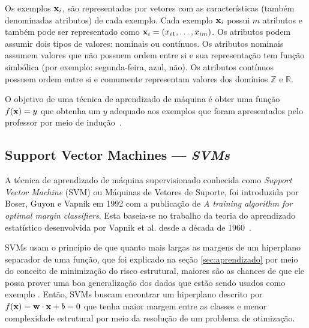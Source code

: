 Os exemplos $\mathbf{x}_i$, são representados por vetores com as características (também denominadas atributos) de cada exemplo. Cada exemplo $\mathbf{x}_i$ possui $m$ atributos e também pode ser representado como $\mathbf{x}_i = (x_{i1},\dotsc,x_{im})$. Os atributos podem assumir dois tipos de valores: nominais ou contínuos. Os atributos nominais assumem valores que não possuem ordem entre si e sua representação tem função simbólica (por exemplo: segunda-feira, azul, não). Os atributos contínuos possuem ordem entre si e comumente representam valores dos domínios $\mathbb{Z}$ e $\mathbb{R}$.

O objetivo de uma técnica de aprendizado de máquina é obter uma função $f(\mathbf{x}) = y$ que obtenha um $y$ adequado aos exemplos que foram apresentados pelo professor por meio de indução~\cite{osuna1997support}.


\subsection{Support Vector Machines --- \it{SVMs}}\label{sec:svm}
%

A técnica de aprendizado de máquina supervisionado conhecida como \emph{Support Vector Machine} (SVM) ou Máquinas de Vetores de Suporte, foi introduzida por Boser, Guyon e Vapnik em 1992 com a publica\c{c}ão de \emph{A training algorithm for optimal margin classifiers}\nocite{boser1992training}. Esta baseia-se no trabalho da teoria do aprendizado estatístico desenvolvida por Vapnik et al. desde a década de 1960~\cite{antos2003data}.

SVMs usam o princípio de que quanto mais largas as margens de um hiperplano separador de uma fun\c{c}ão, que foi explicado na se\c{c}ão \ref{sec:aprendizado} por meio do conceito de minimiza\c{c}ão do risco estrutural, maiores são as chances de que ele possa prover uma boa generaliza\c{c}ão dos dados que estão sendo usados como exemplo \cite{chapelle2002choosing}. Então, SVMs buscam encontrar um hiperplano descrito por $f(\mathbf{x}) = \mathbf{w}\cdot\mathbf{x} + b = 0$ que tenha maior margem entre as classes e menor complexidade estrutural por meio da resolu\c{c}ão de um problema de otimiza\c{c}ão.

